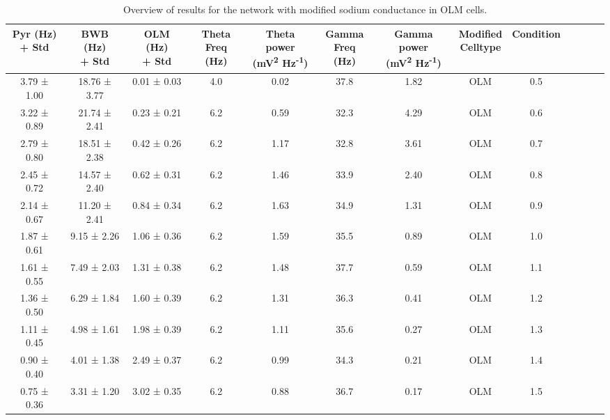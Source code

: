 \begin{table}[htbp]
    \caption[Sodium variant: OLM cell]{Overview of results for the network with modified sodium conductance in OLM cells.}\label{table:NA_variant_OLM}
    \begin{adjustbox}{width=\textwidth}
        \begin{tabular}{ccccccccccccc}
            \hline
            \CellWithForcedBreak{Pyr (Hz)                                                   \\ + Std} & \CellWithForcedBreak{BWB (Hz) \\ + Std} & \CellWithForcedBreak{OLM (Hz) \\ + Std} & \CellWithForcedBreak{Theta \\ Freq (Hz)} & \CellWithForcedBreak{Theta power \\ (mV\textsuperscript{2} Hz\textsuperscript{-1})} & \CellWithForcedBreak{Gamma \\ Freq (Hz)} & \CellWithForcedBreak{Gamma power \\ (mV\textsuperscript{2} Hz\textsuperscript{-1})} & \CellWithForcedBreak{Modified \\ Celltype} & Condition \\
            \hline
            3.79 ± 1.00 & 18.76 ± 3.77 & 0.01 ± 0.03 & 4.0 & 0.02 & 37.8 & 1.82 & OLM & 0.5 \\
            3.22 ± 0.89 & 21.74 ± 2.41 & 0.23 ± 0.21 & 6.2 & 0.59 & 32.3 & 4.29 & OLM & 0.6 \\
            2.79 ± 0.80 & 18.51 ± 2.38 & 0.42 ± 0.26 & 6.2 & 1.17 & 32.8 & 3.61 & OLM & 0.7 \\
            2.45 ± 0.72 & 14.57 ± 2.40 & 0.62 ± 0.31 & 6.2 & 1.46 & 33.9 & 2.40 & OLM & 0.8 \\
            2.14 ± 0.67 & 11.20 ± 2.41 & 0.84 ± 0.34 & 6.2 & 1.63 & 34.9 & 1.31 & OLM & 0.9 \\
            1.87 ± 0.61 & 9.15 ± 2.26  & 1.06 ± 0.36 & 6.2 & 1.59 & 35.5 & 0.89 & OLM & 1.0 \\
            1.61 ± 0.55 & 7.49 ± 2.03  & 1.31 ± 0.38 & 6.2 & 1.48 & 37.7 & 0.59 & OLM & 1.1 \\
            1.36 ± 0.50 & 6.29 ± 1.84  & 1.60 ± 0.39 & 6.2 & 1.31 & 36.3 & 0.41 & OLM & 1.2 \\
            1.11 ± 0.45 & 4.98 ± 1.61  & 1.98 ± 0.39 & 6.2 & 1.11 & 35.6 & 0.27 & OLM & 1.3 \\
            0.90 ± 0.40 & 4.01 ± 1.38  & 2.49 ± 0.37 & 6.2 & 0.99 & 34.3 & 0.21 & OLM & 1.4 \\
            0.75 ± 0.36 & 3.31 ± 1.20  & 3.02 ± 0.35 & 6.2 & 0.88 & 36.7 & 0.17 & OLM & 1.5 \\
            \hline
        \end{tabular}
    \end{adjustbox}
\end{table}
